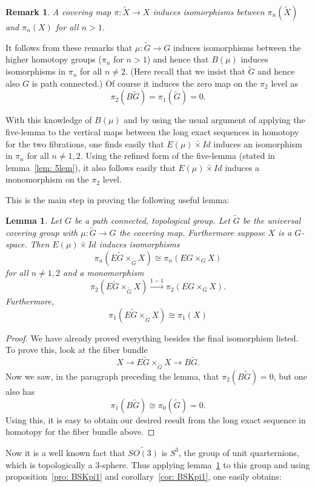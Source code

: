 \documentclass{amsart}
\newtheorem{lem}[thm]{Lemma}
\newtheorem{rem}[thm]{Remark}
\begin{document}
\begin{rem}
A covering map $\pi: \tilde{X} \rightarrow X$ induces
isomorphisms between $\pi_n(\tilde{X})$ and $\pi_n(X)$
for all $n>1$. 
\end{rem}

It follows from these remarks that $\mu : \tilde{G} \rightarrow G$
induces isomorphisms between the higher homotopy groups ($\pi_n$ for
$n>1$) and hence that $B(\mu)$ induces isomorphisms in $\pi_n$ for
all $n \neq 2$. (Here recall that we insist that $\tilde{G}$ and
hence also $G$ is 
path connected.) Of course it induces the zero map on the $\pi_2$ level
as 
$$
\pi_2(B\tilde{G}) = \pi_1(\tilde{G}) = 0.
$$

With this knowledge of $B(\mu)$ and by
using the usual argument of applying the five-lemma to the
vertical maps between the long exact 
sequences in homotopy for the two fibrations, one finds easily that
$E(\mu) \bar{\times} Id$ induces an isomorphism in $\pi_n$
for all $n \neq 1,2$. Using the refined form of the five-lemma
(stated in lemma~\ref{lem: 5lem}), it also follows easily that
$E(\mu) \bar{\times} Id$ induces a monomorphism on the $\pi_2$
level. 

This is the main step in proving the following useful lemma:

\begin{lem}
\label{lem: compareBorel}
Let $G$ be a path connected, topological group.
Let $\tilde{G}$ be the universal covering group with
$\mu: \tilde{G} \rightarrow G$ the covering map. Furthermore
suppose $X$ is a $G$-space. Then
$E(\mu) \bar{\times} Id$ induces isomorphisms
$$
\pi_n(E\tilde{G} \times_{\tilde{G}} X) \cong \pi_n(EG \times_G X)
$$
for all $n \neq 1,2$ and a monomorphism
$$
\pi_2(E\tilde{G} \times_{\tilde{G}} X) \overset{1-1}{\rightarrow}
 \pi_2(EG \times_G X).
$$
Furthermore,
$$
\pi_1(E\tilde{G} \times_{\tilde{G}} X) \cong \pi_1(X) 
$$
\end{lem}
\begin{proof}
We have already proved everything besides the final isomorphism listed.
To prove this, look at the fiber bundle
$$
X \rightarrow E\tilde{G} \times_{\tilde{G}} X \rightarrow B\tilde{G}.
$$ 
Now we saw, in the paragraph preceding the lemma, that 
$\pi_2(B\tilde{G})=0$, but one also has
$$
\pi_1(B\tilde{G}) \cong \pi_{0}(\tilde{G})=0.
$$
Using this, it is easy to obtain our desired result 
from the
long exact sequence in homotopy for the fiber bundle above.
\end{proof}

Now it is a well known fact that $\widetilde{SO(3)}$ is $S^3$,
the group of unit quarternions, which is topologically a 3-sphere.
Thus applying lemma~\ref{lem: compareBorel} to this group and
using proposition~\ref{pro: BSKpi1} and
corollary~\ref{cor: BSKpi1}, one easily obtains:
\end{document}
